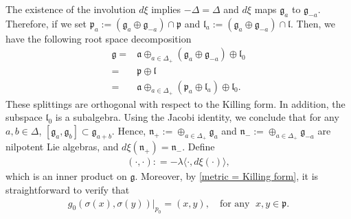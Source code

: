 \documentclass[12pt]{amsart}
\begin{document}
The existence of the involution $d\xi$ implies $-\Delta=\Delta$ and $d\xi$ maps $\mathfrak{g}_{a}$ to $\mathfrak{g}_{-a}$. Therefore, if we set  $\mathfrak{p}_{a} := (\mathfrak{g}_{a} \oplus \mathfrak{g}_{-a}) \cap \mathfrak{p}$ and $\mathfrak{l}_{a} := (\mathfrak{g}_{a} \oplus \mathfrak{g}_{-a}) \cap \mathfrak{l}$.  Then, we have the following root space decomposition
\begin{align*}
	\mathfrak{g}=
    &\mathfrak{a}\oplus_{a\in\Delta_{+}}(\mathfrak{g}_{a}\oplus\mathfrak{g}_{-a})\oplus\mathfrak{l}_{0} \\
	=&\mathfrak{p}\oplus\mathfrak{l}\\
    =&\mathfrak{a}\oplus_{a\in\Delta_{+}}(\mathfrak{p}_{a}\oplus\mathfrak{l}_{a})\oplus\mathfrak{l}_{0}. 
\end{align*}
These splittings are orthogonal with respect to the Killing form. In addition, the subspace $\mathfrak{l}_{0}$ is a subalgebra. Using the Jacobi identity, we conclude that for any $a,b\in\Delta$, $[\mathfrak{g}_{a},\mathfrak{g}_{b}]\subset\mathfrak{g}_{a+b}$. Hence, $\mathfrak{n}_{+}:=\oplus_{a\in\Delta_{+}}\mathfrak{g}_{a}$ and $\mathfrak{n}_{-}:=\oplus_{a\in\Delta_{+}}\mathfrak{g}_{-a}$ are nilpotent Lie algebras, and $d\xi(\mathfrak{n}_{+})=\mathfrak{n}_{-}$. Define  
\begin{align}\label{inner product on lie algebra}
	(\cdot, \cdot): = -\lambda \langle \cdot, d\xi(\cdot) \rangle,
\end{align}
which is an inner product on $\mathfrak{g}$. Moreover, by \eqref{metric = Killing form}, it is straightforward to verify that
\begin{align*}
    g_0(\sigma(x), \sigma(y))|_{p_0} = (x, y),\quad \text{for any }\; x, y\in \mathfrak{p}. 
\end{align*}
\end{document}
